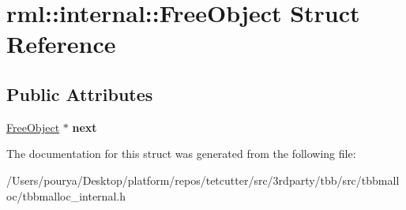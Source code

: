 \hypertarget{structrml_1_1internal_1_1FreeObject}{}\section{rml\+:\+:internal\+:\+:Free\+Object Struct Reference}
\label{structrml_1_1internal_1_1FreeObject}
\subsection*{Public Attributes}
\begin{DoxyCompactItemize}
\item 
\hypertarget{structrml_1_1internal_1_1FreeObject_adee876800dbeeb0dc522da323d709452}{}\hyperlink{structrml_1_1internal_1_1FreeObject}{Free\+Object} $\ast$ {\bfseries next}\label{structrml_1_1internal_1_1FreeObject_adee876800dbeeb0dc522da323d709452}

\end{DoxyCompactItemize}


The documentation for this struct was generated from the following file\+:\begin{DoxyCompactItemize}
\item 
/\+Users/pourya/\+Desktop/platform/repos/tetcutter/src/3rdparty/tbb/src/tbbmalloc/tbbmalloc\+\_\+internal.\+h\end{DoxyCompactItemize}
